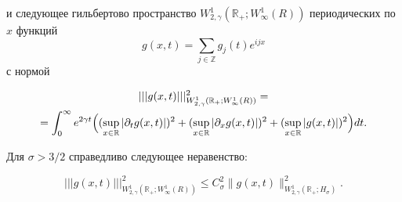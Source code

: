 и следующее гильбертово пространство $W^1_{2,\gamma}(\mathbb R_{+}; W^1_\infty(R))$  периодических по~$x$ функций $$g(x,t)=\sum_{j\in \mathbb Z} g_j(t) e^{ i j x} $$ с нормой

\begin{multline}

|||g(x,t)|||^2_{W^1_{2,\gamma}(\mathbb R_{+}; W^1_\infty(R))}=

\\

=\int_0^\infty e^{2\gamma t} \Bigl((\sup_{x\in \mathbb R}|\pa_tg(x,t)|)^2+(\sup_{x\in \mathbb R}|\pa_xg(x,t)|)^2+(\sup_{x\in \mathbb R}|g(x,t)|)^2\Bigr) dt.

\label{duh:newNorm}

\end{multline}



\smallskip



\begin{lemma}[5]Для $\sigma>3/2$ справедливо следующее неравенство{\/\rm:}

\begin{equation}

|||g(x,t)|||^2_{W^1_{2,\gamma}(\mathbb R_{+}; W^1_\infty(R))}\le C^2_\sigma \|g(x,t)\|^2_{W^1_{2,\gamma}(\mathbb R_{+}; H_{\sigma})}.

\label{duh:WsigmaWinfty} 

\end{equation}

\end{lemma}



